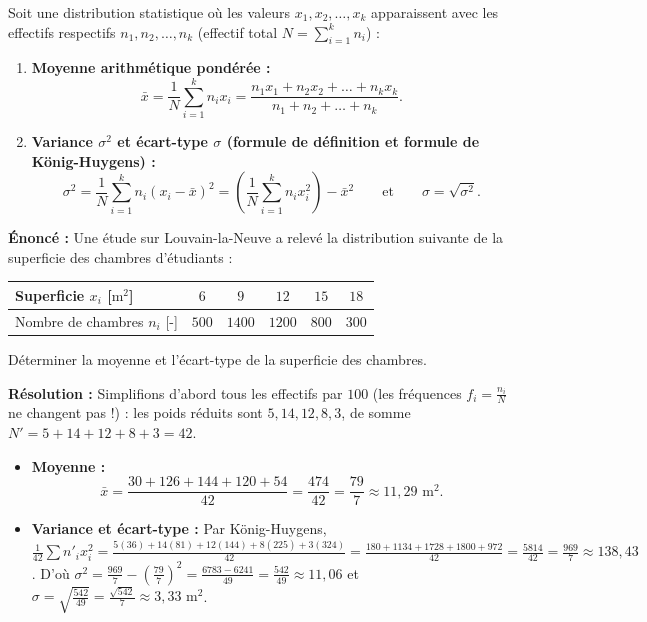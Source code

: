 \begin{theoreme}
Soit une distribution statistique où les valeurs $x_1, x_2, \dots, x_k$ apparaissent avec les effectifs respectifs $n_1, n_2, \dots, n_k$ (effectif total $N = \sum_{i=1}^k n_i$) :
\begin{enumerate}
    \item \textbf{Moyenne arithmétique pondérée :}
    \[
        \boxed{\bar{x} = \frac{1}{N}\sum_{i=1}^k n_i x_i = \frac{n_1 x_1 + n_2 x_2 + \dots + n_k x_k}{n_1 + n_2 + \dots + n_k}}.
    \]
    \item \textbf{Variance $\sigma^2$ et écart-type $\sigma$ (formule de définition et formule de König-Huygens) :}
    \[
        \boxed{\sigma^2 = \frac{1}{N}\sum_{i=1}^k n_i (x_i - \bar{x})^2 = \left(\frac{1}{N}\sum_{i=1}^k n_i x_i^2\right) - \bar{x}^2} \qquad \text{et} \qquad \boxed{\sigma = \sqrt{\sigma^2}}.
    \]
\end{enumerate}
\end{theoreme}

\begin{exemple}
\textbf{Énoncé :} Une étude sur Louvain-la-Neuve a relevé la distribution suivante de la superficie des chambres d'étudiants :
\begin{center}
\begin{tabular}{|l|c|c|c|c|c|}
\hline
Superficie $x_i$ [$\text{m}^2$] & $6$ & $9$ & $12$ & $15$ & $18$ \\ \hline
Nombre de chambres $n_i$ [-] & $500$ & $1400$ & $1200$ & $800$ & $300$ \\ \hline
\end{tabular}
\end{center}
Déterminer la moyenne et l'écart-type de la superficie des chambres.

\textbf{Résolution :} Simplifions d'abord tous les effectifs par $100$ (les fréquences $f_i = \frac{n_i}{N}$ ne changent pas !) : les poids réduits sont $5, 14, 12, 8, 3$, de somme $N' = 5 + 14 + 12 + 8 + 3 = 42$.
\begin{itemize}
    \item \textbf{Moyenne :}
    \[
        \bar{x} = \frac{30 + 126 + 144 + 120 + 54}{42} = \frac{474}{42} = \frac{79}{7} \approx \boxed{11,29\text{ m}^2}.
    \]
    \item \textbf{Variance et écart-type :} Par König-Huygens, $\frac{1}{42}\sum n'_i x_i^2 = \frac{5(36) + 14(81) + 12(144) + 8(225) + 3(324)}{42} = \frac{180 + 1134 + 1728 + 1800 + 972}{42} = \frac{5814}{42} = \frac{969}{7} \approx 138,43$. D'où $\sigma^2 = \frac{969}{7} - \left(\frac{79}{7}\right)^2 = \frac{6783 - 6241}{49} = \frac{542}{49} \approx 11,06$ et $\sigma = \sqrt{\frac{542}{49}} = \frac{\sqrt{542}}{7} \approx \boxed{3,33\text{ m}^2}$.
\end{itemize}
\end{exemple}

